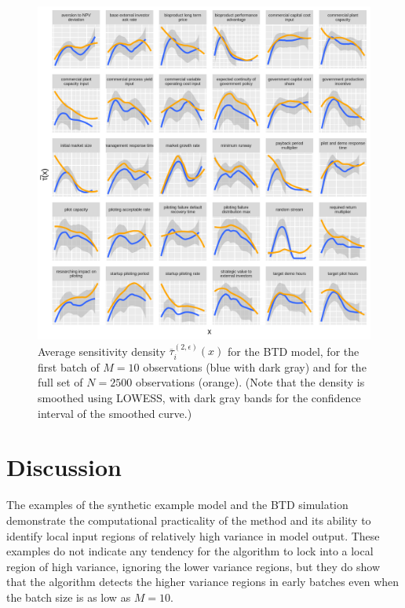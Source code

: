 \documentclass[12pt]{article}
\begin{document}
\begin{figure}
    \centering
    \includegraphics[width=\linewidth]{figures/btd-taubar1.png}
    \caption{Average sensitivity density $\overline{\tau}_i^{(2,\epsilon)}(x)$ for the BTD model, for the first batch of $M = 10$ observations (blue with dark gray) and for the full set of $N = 2500$ observations (orange). (Note that the density is smoothed using LOWESS, with dark gray bands for the confidence interval of the smoothed curve.)}
    \label{fig:btd-taubar1}
\end{figure}


\section{Discussion}
\label{sec:discuss}

The examples of the synthetic example model and the BTD simulation demonstrate the computational practicality of the method and its ability to identify local input regions of relatively high variance in model output. These examples do not indicate any tendency for the algorithm to lock into a local region of high variance, ignoring the lower variance regions, but they do show that the algorithm detects the higher variance regions in early batches even when the batch size is as low as $M = 10$.
\end{document}
